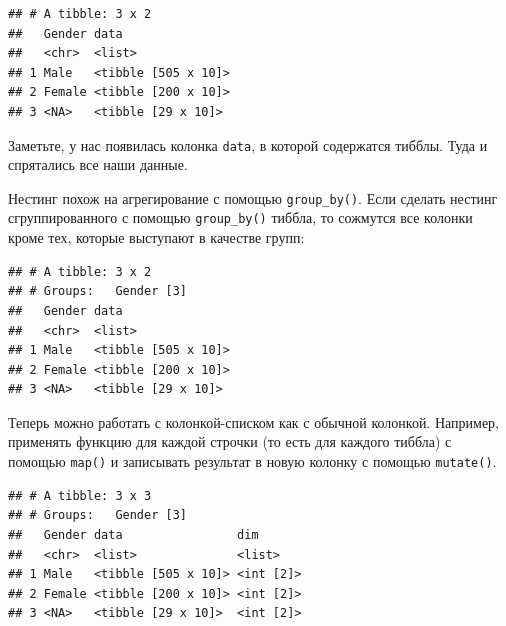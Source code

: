 \documentclass[]{book}
\newenvironment{Shaded}{\begin{snugshade}}{\end{snugshade}}
\newcommand{\KeywordTok}[1]{\textcolor[rgb]{0.13,0.29,0.53}{\textbf{#1}}}
\newcommand{\DataTypeTok}[1]{\textcolor[rgb]{0.13,0.29,0.53}{#1}}
\newcommand{\StringTok}[1]{\textcolor[rgb]{0.31,0.60,0.02}{#1}}
\newcommand{\OperatorTok}[1]{\textcolor[rgb]{0.81,0.36,0.00}{\textbf{#1}}}
\newcommand{\NormalTok}[1]{#1}
\begin{document}
\begin{verbatim}
## # A tibble: 3 x 2
##   Gender data               
##   <chr>  <list>             
## 1 Male   <tibble [505 x 10]>
## 2 Female <tibble [200 x 10]>
## 3 <NA>   <tibble [29 x 10]>
\end{verbatim}

Заметьте, у нас появилась колонка \texttt{data}, в которой содержатся
тибблы. Туда и спрятались все наши данные.

Нестинг похож на агрегирование с помощью \texttt{group\_by()}. Если
сделать нестинг сгруппированного с помощью \texttt{group\_by()} тиббла,
то сожмутся все колонки кроме тех, которые выступают в качестве групп:

\begin{Shaded}
\end{Shaded}

\begin{verbatim}
## # A tibble: 3 x 2
## # Groups:   Gender [3]
##   Gender data               
##   <chr>  <list>             
## 1 Male   <tibble [505 x 10]>
## 2 Female <tibble [200 x 10]>
## 3 <NA>   <tibble [29 x 10]>
\end{verbatim}

Теперь можно работать с колонкой-списком как с обычной колонкой.
Например, применять функцию для каждой строчки (то есть для каждого
тиббла) с помощью \texttt{map()} и записывать результат в новую колонку
с помощью \texttt{mutate()}.

\begin{Shaded}
\end{Shaded}

\begin{verbatim}
## # A tibble: 3 x 3
## # Groups:   Gender [3]
##   Gender data                dim      
##   <chr>  <list>              <list>   
## 1 Male   <tibble [505 x 10]> <int [2]>
## 2 Female <tibble [200 x 10]> <int [2]>
## 3 <NA>   <tibble [29 x 10]>  <int [2]>
\end{verbatim}
\end{document}
